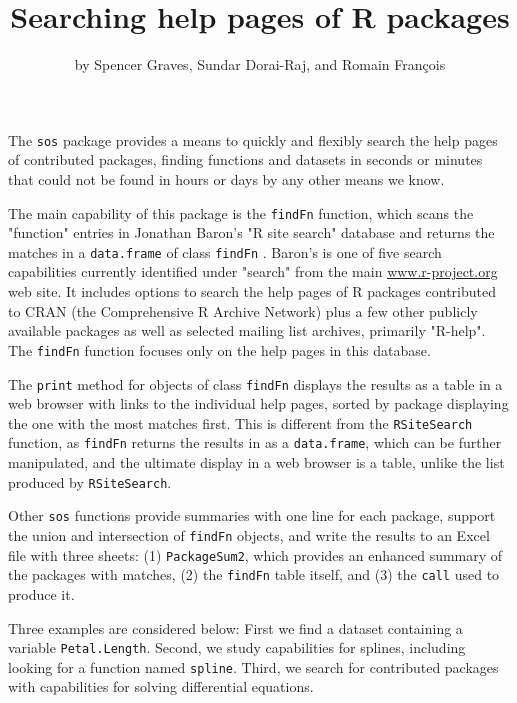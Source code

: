 \title{Searching help pages of R packages}
\author{by Spencer Graves, Sundar Dorai-Raj, and Romain Fran{\c c}ois}

\maketitle

The {\tt sos} package provides a means to quickly and flexibly
search the help pages of contributed packages, finding
functions and datasets in seconds or minutes that could not be
found in hours or days by any other means we know.

The main capability of this package is the {\tt findFn} function, which scans the "function" entries in Jonathan Baron's "R site search"
database and returns the matches in a {\tt data.frame} of class
{\tt findFn} \citep{JB09URL}.  Baron's is one of five
search capabilities currently identified under "search" from the main
\url{www.r-project.org} web site. It includes options to
search the help pages of R packages contributed to CRAN (the
Comprehensive R Archive Network) plus a few other publicly
available packages as well as selected mailing list archives,
primarily "R-help".  The {\tt findFn} function focuses only
on the help pages in this database.

The {\tt print} method for objects of class {\tt findFn}
displays the results as a table in a web
browser with links to the individual help pages, sorted by package
displaying the one with the most matches first.  This is different
from the {\tt RSiteSearch} function, as {\tt findFn} returns
the results in \R{} as a {\tt data.frame}, which can be further
manipulated, and the ultimate display in a web browser is a
table, unlike the list produced by {\tt RSiteSearch}.

Other {\tt sos} functions provide summaries with one line for each
package, support the union and intersection of {\tt findFn} objects,
and write the results to an Excel file with three sheets:  (1)
{\tt PackageSum2}, which provides an enhanced summary of the packages
with matches, (2) the {\tt findFn} table itself, and (3) the {\tt call}
used to produce it.

Three examples are considered below:  First we find a dataset
containing a variable {\tt Petal.Length}. Second, we study
\R{} capabilities for splines, including looking for a function
named {\tt spline}.  Third, we search for contributed \R{} packages
 with capabilities for solving differential equations.

